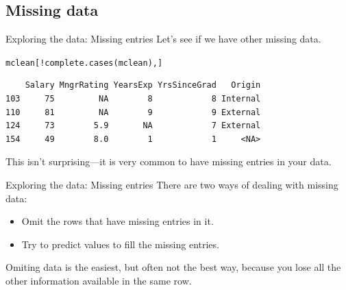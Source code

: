 \documentclass{beamer}\usepackage[]{graphicx}\usepackage[]{color}
\makeatletter
\newcommand{\hlnum}[1]{\textcolor[rgb]{0.824,0.412,0.118}{#1}}%
\newcommand{\hlopt}[1]{\textcolor[rgb]{1,0.894,0.769}{#1}}%
\newcommand{\hlstd}[1]{\textcolor[rgb]{1,0.894,0.769}{#1}}%
\newcommand{\hlkwb}[1]{\textcolor[rgb]{0.804,0.776,0.451}{#1}}%
\newcommand{\hlkwd}[1]{\textcolor[rgb]{1,0.78,0.769}{#1}}%
\newenvironment{kframe}{%
 \def\at@end@of@kframe{}%
 \ifinner\ifhmode%
  \def\at@end@of@kframe{\end{minipage}}%
  \begin{minipage}{\columnwidth}%
 \fi\fi%
 \def\FrameCommand##1{\hskip\@totalleftmargin \hskip-\fboxsep
 \colorbox{shadecolor}{##1}\hskip-\fboxsep
     \hskip-\linewidth \hskip-\@totalleftmargin \hskip\columnwidth}%
 \MakeFramed {\advance\hsize-\width
   \@totalleftmargin\z@ \linewidth\hsize
   \@setminipage}}%
 {\par\unskip\endMakeFramed%
 \at@end@of@kframe}
\newenvironment{knitrout}{}{} %
\makeatother
\begin{document}
\begin{darkframes}
    
    \section{Missing data}
    
\begin{frame}[fragile]{Exploring the data: Missing entries}
      Let's see if we have other missing data. \pause
\begin{knitrout}
\begin{kframe}
\begin{alltt}
  \hlstd{mclean[}\hlopt{!}\hlkwd{complete.cases}\hlstd{(mclean),]}
\end{alltt}
\begin{verbatim}
    Salary MngrRating YearsExp YrsSinceGrad   Origin
103     75         NA        8            8 Internal
110     81         NA        9            9 External
124     73        5.9       NA            7 External
154     49        8.0        1            1     <NA>
\end{verbatim}
\end{kframe}
\end{knitrout}
      \pause
      This isn't surprising---it is very common to have missing entries in your data.
\end{frame}
    
  
  
  
\begin{frame}[fragile]{Exploring the data: Missing entries}
      There are two ways of dealing with missing data:
      \begin{itemize}[<+->]
        \item Omit the rows that have missing entries in it.
        \item Try to predict values to fill the missing entries.      
      \end{itemize}
      Omiting data is the easiest, but often \alert{not the best way, because you lose all the other information available in the same row}. \pause \bigskip
      

\end{frame}
\end{darkframes}
\end{document}
